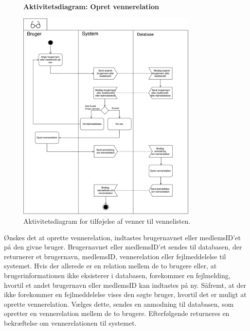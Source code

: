 \begin{figure} [H]
\centering
\textbf{Aktivitetsdiagram: Opret vennerelation}\par\medskip
\includegraphics[width=0.8\textwidth]{figures/aktivitetsdiagram/foelgnyven}
\caption{Aktivitetsdiagram for tilføjelse af venner til vennelisten.}
\label{fig:tilfoejven}
\end{figure}

\noindent
Ønskes det at oprette vennerelation, indtastes brugernavnet eller medlemsID'et på den givne bruger. Brugernavnet eller medlemsID'et sendes til databasen, der returnerer et brugernavn, medlemsID, vennerelation eller fejlmeddelelse til systemet. Hvis der allerede er en relation mellem de to brugere eller, at brugerinformationen ikke eksisterer i databasen, forekommer en fejlmelding, hvortil et andet brugernavn eller medlemsID kan indtastes på ny. 
Såfremt, at der ikke forekommer en fejlmeddelelse vises den søgte bruger, hvortil det er muligt at oprette vennerelation. 
Vælges dette, sendes en anmodning til databasen, som opretter en vennerelation mellem de to brugere. Efterfølgende returneres en bekræftelse om vennerelationen til systemet.